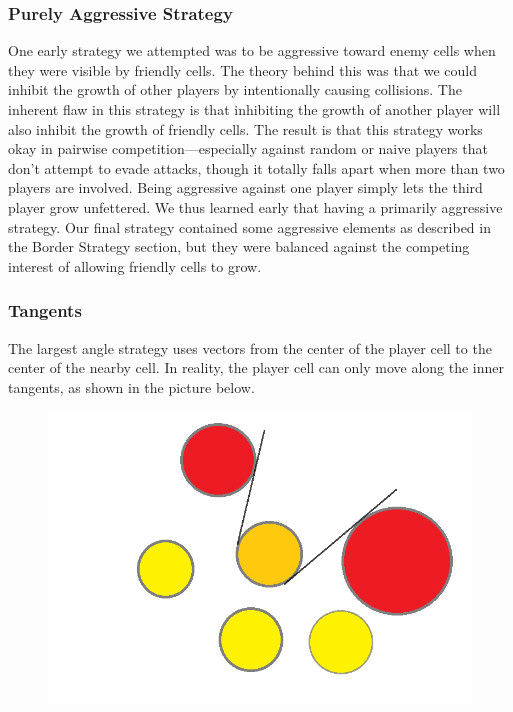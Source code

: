 \subsubsection{Purely Aggressive Strategy}
One early strategy we attempted was to be aggressive toward enemy cells when they were visible by friendly cells. The theory behind this was that we could inhibit the growth of other players by intentionally causing collisions. The inherent flaw in this strategy is that inhibiting the growth of another player will also inhibit the growth of friendly cells. The result is that this strategy works okay in pairwise competition—especially against random or naive players that don’t attempt to evade attacks, though it totally falls apart when more than two players are involved. Being aggressive against one player simply lets the third player grow unfettered. We thus learned early that having a primarily aggressive strategy. Our final strategy contained some aggressive elements as described in the Border Strategy section, but they were balanced against the competing interest of allowing friendly cells to grow.\\

\subsubsection{Tangents}
The largest angle strategy uses vectors from the center of the player cell to the center of the nearby cell. In reality, the player cell can only move along the inner tangents, as shown in the picture below.
\begin{figure}[!htb]
\center
\includegraphics[scale=0.6]{tangents.png}
\caption{}
\label{fig:tangents}
\end{figure}

